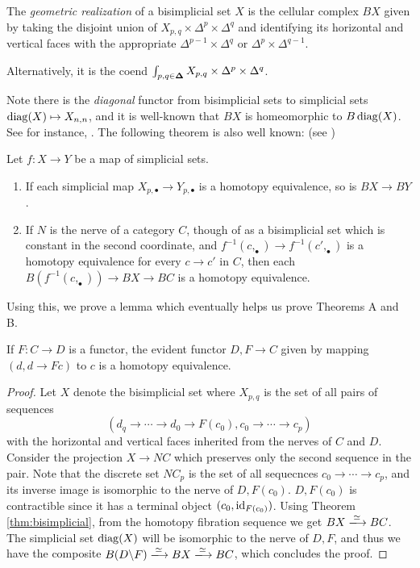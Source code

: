 \begin{definition}
The \emph{geometric realization} of a bisimplicial set $X$
is the cellular complex $BX$ given by taking the disjoint union of $X_{p,q} \times \Delta^p \times \Delta^q$
and identifying its horizontal and vertical faces with the appropriate
$\Delta^{p-1} \times \Delta^q$ or $\Delta^p \times \Delta^{q-1}$.

Alternatively, it is the coend $\int_{p,q \in \mathbf{\Delta}} X_{p,q} \times \Delta^p \times \Delta^q$.
\end{definition}

Note there is the \emph{diagonal} functor from bisimplicial sets to simplicial sets
$\operatorname*{diag}(X) \mapsto X_{n,n}$, and it is well-known that $BX$ is homeomorphic to $B \operatorname*{diag}(X)$.
See for instance, \cite{Bousfield}. The following theorem is also well known: (see \cite{Waldhausen78})

\begin{theorem}\label{thm:bisimplicial}
 Let $f : X \to Y$ be a map of simplicial sets. 
 \begin{enumerate}
    \item If each simplicial map $X_{p,\bullet} \to Y_{p,\bullet}$ is a homotopy equivalence,
    so is $BX \to BY$.
    \item If $N$ is the nerve of a category $C$, though of as a bisimplicial set which is constant
    in the second coordinate,
    and $f^{-1}(c, _\bullet) \to f^{-1}(c', _\bullet)$ is a homotopy equivalence for every $c \to c'$ in $C$,
    then each $B(f^{-1}(c, _\bullet)) \to BX \to BC$ is a homotopy equivalence.
 \end{enumerate}
\end{theorem}

Using this, we prove a lemma which eventually helps us prove Theorems A and B.
\begin{lemma}[Quillen] \label{lemma:bisimplicial}
If $F : C \to D$ is a functor, the evident functor $D \comma F \to C$ given by mapping $(d, d \to Fc)$ to $c$
is a homotopy equivalence.
\end{lemma}
\begin{proof}
Let $X$ denote the bisimplicial set where $X_{p,q}$ is the set of all pairs of sequences
\[
(d_q \to \cdots \to d_0 \to F(c_0), c_0 \to \cdots \to c_p)
\]
with the horizontal and vertical faces inherited from the nerves of $C$ and $D$.
Consider the projection $X \to NC$ which preserves only the second sequence in the pair.
Note that the discrete set $NC_p$ is the set of all sequecnces $c_0 \to \cdots \to c_p$,
and its inverse image is isomorphic to the nerve of $D \comma F(c_0)$.
$D \comma F(c_0)$ is contractible since it has a terminal object $(c_0,\operatorname*{id}_{F(c_0)})$.
Using Theorem \ref{thm:bisimplicial}, from the homotopy fibration sequence we get $BX \xlongrightarrow{\eqv} BC$.
The simplicial set $\operatorname*{diag}(X)$ will be isomorphic to the nerve of $D \comma F$, and thus we have the composite
$B(D \comma F) \xlongrightarrow{\eqv} BX \xlongrightarrow{\eqv} BC$, which concludes the proof.

\end{proof}

